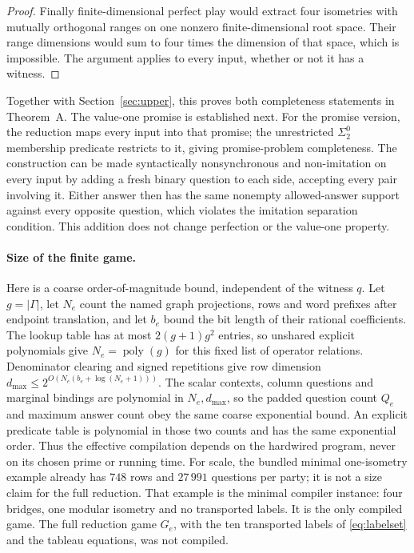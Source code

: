\begin{proof}
Finally finite-dimensional perfect play would extract four isometries with mutually orthogonal ranges on one nonzero finite-dimensional root space. Their range dimensions would sum to four times the dimension of that space, which is impossible. The argument applies to every input, whether or not it has a witness.
\end{proof}

Together with Section~\ref{sec:upper}, this proves both completeness statements in Theorem~A. The value-one promise is established next. For the promise version, the reduction maps every input into that promise; the unrestricted $\Sigma^0_2$ membership predicate restricts to it, giving promise-problem completeness. The construction can be made syntactically nonsynchronous and non-imitation on every input by adding a fresh binary question to each side, accepting every pair involving it. Either answer then has the same nonempty allowed-answer support against every opposite question, which violates the imitation separation condition. This addition does not change perfection or the value-one property.

\paragraph{Size of the finite game.}
Here is a coarse order-of-magnitude bound, independent of the witness $q$.
Let $g=|\Gamma|$, let $N_e$ count the named graph projections, rows and
word prefixes after endpoint translation, and let $b_e$ bound the bit
length of their rational coefficients. The lookup table has at most
$2(g+1)g^2$ entries, so unshared explicit polynomials give
$N_e=\operatorname{poly}(g)$ for this fixed list of operator relations.
Denominator clearing and signed repetitions give row dimension
$d_{\max}\leq2^{O(N_e(b_e+\log(N_e+1)))}$.
The scalar contexts, column questions and marginal bindings are polynomial
in $N_e,d_{\max}$, so the padded question count $Q_e$ and maximum answer
count obey the same coarse exponential bound. An explicit predicate table
is polynomial in those two counts and has the same exponential order.
Thus the effective compilation depends on the hardwired program, never on
its chosen prime or running time. For scale, the bundled minimal
one-isometry example already has $748$ rows and $27\,991$ questions per
party; it is not a size claim for the full reduction. That example is the
minimal compiler instance: four bridges, one modular isometry and no
transported labels. It is the only compiled game. The full reduction game
$G_e$, with the ten transported labels of \eqref{eq:labelset} and the
tableau equations, was not compiled.
